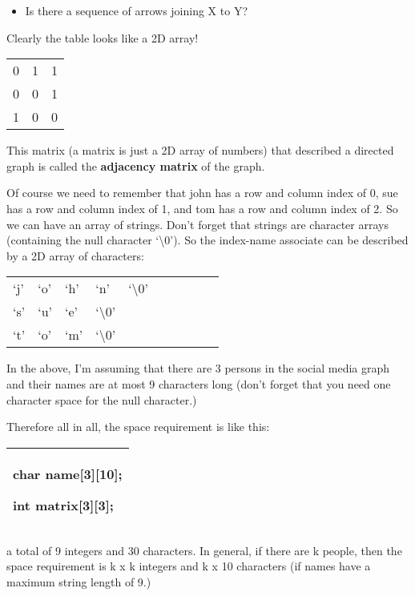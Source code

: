 \documentclass[
]{article}
\providecommand{\tightlist}{%
  \setlength{\itemsep}{0pt}\setlength{\parskip}{0pt}}
\begin{document}
\begin{itemize}
\tightlist
\item
  Is there a sequence of arrows joining X to Y?
\end{itemize}

Clearly the table looks like a 2D array!

\begin{longtable}[]{@{}lll@{}}
\toprule
\endhead
0 & 1 & 1\tabularnewline
0 & 0 & 1\tabularnewline
1 & 0 & 0\tabularnewline
\bottomrule
\end{longtable}

This matrix (a matrix is just a 2D array of numbers) that described a
directed graph is called the \textbf{adjacency matrix} of the graph.

Of course we need to remember that john has a row and column index of 0,
sue has a row and column index of 1, and tom has a row and column index
of 2. So we can have an array of strings. Don't forget that strings are
character arrays (containing the null character `\textbackslash0'). So
the index-name associate can be described by a 2D array of characters:

\begin{longtable}[]{@{}llllllllll@{}}
\toprule
\endhead
`j' & `o' & `h' & `n' & `\textbackslash0' & & & & &\tabularnewline
`s' & `u' & `e' & `\textbackslash0' & & & & & &\tabularnewline
`t' & `o' & `m' & `\textbackslash0' & & & & & &\tabularnewline
\bottomrule
\end{longtable}

In the above, I'm assuming that there are 3 persons in the social media
graph and their names are at most 9 characters long (don't forget that
you need one character space for the null character.)

Therefore all in all, the space requirement is like this:

\begin{longtable}[]{@{}l@{}}
\toprule
\endhead
\begin{minipage}[t]{0.97\columnwidth}\raggedright
char name{[}3{]}{[}10{]};

int matrix{[}3{]}{[}3{]}; \strut
\end{minipage}\tabularnewline
\bottomrule
\end{longtable}

a total of 9 integers and 30 characters. In general, if there are k
people, then the space requirement is k x k integers and k x 10
characters (if names have a maximum string length of 9.)
\end{document}
